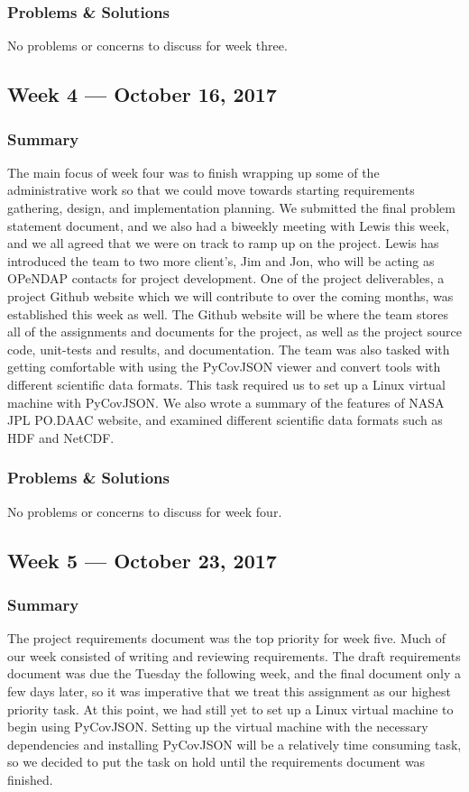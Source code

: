 \documentclass[onecolumn, draftclsnofoot,10pt, compsoc]{IEEEtran}
\begin{document}
\subsubsection{Problems \& Solutions}
No problems or concerns to discuss for week three.

\subsection{Week 4 --- October 16, 2017}
\subsubsection{Summary}
The main focus of week four was to finish wrapping up some of the administrative work so that we could move towards starting requirements gathering, design, and implementation planning. We submitted the final problem statement document, and we also had a biweekly meeting with Lewis this week, and we all agreed that we were on track to ramp up on the project. Lewis has introduced the team to two more client's, Jim and Jon, who will be acting as OPeNDAP contacts for project development. One of the project deliverables, a project Github website which we will contribute to over the coming months, was established this week as well. The Github website will be where the team stores all of the assignments and documents for the project, as well as the project source code, unit-tests and results, and documentation. The team was also tasked with getting comfortable with using the PyCovJSON viewer and convert tools with different scientific data formats. This task required us to set up a Linux virtual machine with PyCovJSON. We also wrote a summary of the features of NASA JPL PO.DAAC website, and examined different scientific data formats such as HDF and NetCDF.
\subsubsection{Problems \& Solutions}
No problems or concerns to discuss for week four.

\subsection{Week 5 --- October 23, 2017}
\subsubsection{Summary}
The project requirements document was the top priority for week five. Much of our week consisted of writing and reviewing requirements. The draft requirements document was due the Tuesday the following week, and the final document only a few days later, so it was imperative that we treat this assignment as our highest priority task. At this point, we had still yet to set up a Linux virtual machine to begin using PyCovJSON. Setting up the virtual machine with the necessary dependencies and installing PyCovJSON will be a relatively time consuming task, so we decided to put the task on hold until the requirements document was finished.
\end{document}
